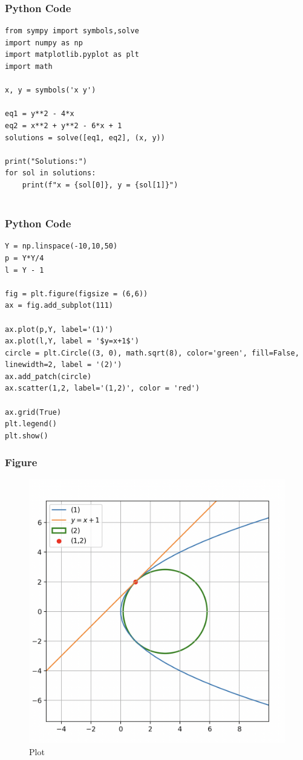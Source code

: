 \documentclass{beamer}
\begin{document}
\begin{frame}[fragile]
    \frametitle{Python Code}
    \begin{lstlisting}
from sympy import symbols,solve
import numpy as np
import matplotlib.pyplot as plt
import math

x, y = symbols('x y')

eq1 = y**2 - 4*x
eq2 = x**2 + y**2 - 6*x + 1
solutions = solve([eq1, eq2], (x, y))

print("Solutions:")
for sol in solutions:
    print(f"x = {sol[0]}, y = {sol[1]}")
    
\end{lstlisting}
\end{frame}
\begin{frame}[fragile]
    \frametitle{Python Code}
    \begin{lstlisting}
Y = np.linspace(-10,10,50)
p = Y*Y/4
l = Y - 1

fig = plt.figure(figsize = (6,6))
ax = fig.add_subplot(111)

ax.plot(p,Y, label='(1)')
ax.plot(l,Y, label = '$y=x+1$')
circle = plt.Circle((3, 0), math.sqrt(8), color='green', fill=False, linewidth=2, label = '(2)')
ax.add_patch(circle)
ax.scatter(1,2, label='(1,2)', color = 'red')

ax.grid(True)
plt.legend()
plt.show()

\end{lstlisting}
\end{frame}

\begin{frame}[fragile]
    \frametitle{Figure}
\begin{figure}[H]
    \centering
    \includegraphics[width=0.5\columnwidth]{Figs/1032.png}
    \caption{Plot}
    \label{fig:placeholder}
\end{figure}
\end{frame}
\end{document}

